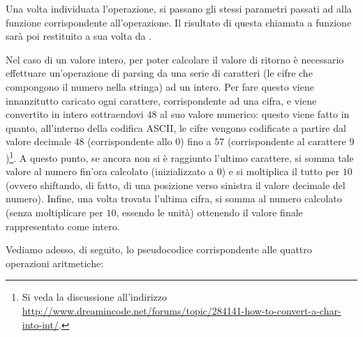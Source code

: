         Una volta individuata l'operazione, si passano gli stessi parametri passati ad  alla funzione corrispondente all'operazione. Il risultato di questa chiamata a funzione sarà poi restituito a sua volta da .
        
        Nel caso di un valore intero, per poter calcolare il valore di ritorno è necessario effettuare un'operazione di parsing da una serie di caratteri (le cifre che compongono il numero nella stringa) ad un intero. Per fare questo viene innanzitutto caricato ogni carattere, corrispondente ad una cifra, e viene convertito in intero sottraendovi $48$ al suo valore numerico: questo viene fatto in quanto, all'interno della codifica ASCII, le cifre vengono codificate a partire dal valore decimale $48$ (corrispondente allo $0$) fino a $57$ (corrispondente al carattere $9$)\footnote{Si veda la discussione all'indirizzo \url{http://www.dreamincode.net/forums/topic/284141-how-to-convert-a-char-into-int/}.}. A questo punto, se ancora non si è raggiunto l'ultimo carattere, si somma tale valore al numero fin'ora calcolato (inizializzato a $0$) e si moltiplica il tutto per $10$ (ovvero shiftando, di fatto, di una posizione verso sinistra il valore decimale del numero). Infine, una volta trovata l'ultima cifra, si somma al numero calcolato (senza moltiplicare per $10$, essendo le unità) ottenendo il valore finale rappresentato come intero.
        
        Vediamo adesso, di seguito, lo pseudocodice corrispondente alle quattro operazioni aritmetiche:
        
